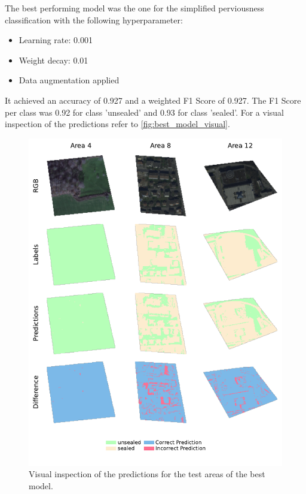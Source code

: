 The best performing model was the one for the simplified perviousness classification
with the following hyperparameter:
\begin{itemize}
    \item Learning rate: 0.001
    \item Weight decay: 0.01
    \item Data augmentation applied
\end{itemize}
It achieved an accuracy of 0.927 and a weighted F1 Score of 0.927.
The F1 Score per class was 0.92 for class 'unsealed' and 0.93 for class 'sealed'.
For a visual inspection of the predictions refer to \autoref{fig:best_model_visual}.

\begin{figure}[H]
    \centering
    \captionsetup{width=0.8\linewidth}
    \includegraphics{figures/best_model_visual.pdf}
    \caption{Visual inspection of the predictions for the test areas of the best model.}
    \label{fig:best_model_visual}
\end{figure}